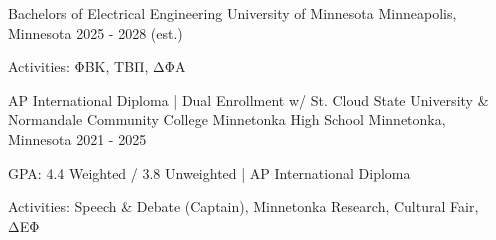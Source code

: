 

\begin{cventries}

    \cventry
    {Bachelors of Electrical Engineering} %
    {University of Minnesota} %
    {Minneapolis, Minnesota} %
    {2025 - 2028 (est.)}
    {
    \begin{cvitems} %
        \item {Activities: ΦΒΚ, ΤΒΠ, ΔΦΑ}
      \end{cvitems}
    }
  
  \cventry
    {AP International Diploma | Dual Enrollment w/ St. Cloud State University \& Normandale Community College} %
    {Minnetonka High School} %
    {Minnetonka, Minnesota} %
    {2021 - 2025}
    {
    \begin{cvitems} %
        \item {GPA: 4.4 Weighted / 3.8 Unweighted | AP International Diploma}
        \item {Activities: Speech \& Debate (Captain), Minnetonka Research, Cultural Fair, ΔΕΦ}
      \end{cvitems}
    }
    
        
\end{cventries}
